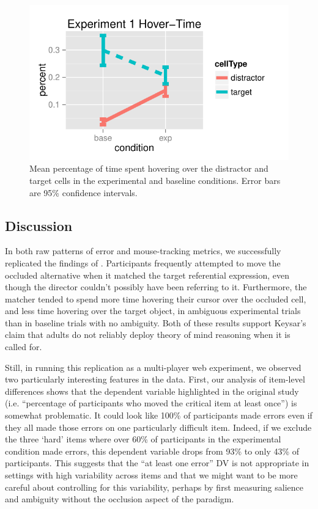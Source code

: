\documentclass[10pt,letterpaper]{article}
\begin{document}
\begin{figure}[b!]
\begin{center}
\includegraphics[scale=.8]{images/exp1MouseTracking.pdf}
\caption{Mean percentage of time spent hovering over the distractor and target cells in the experimental and baseline conditions. Error bars are 95\% confidence intervals.}
\label{fig:exp1hover}
\end{center}
\end{figure}

\subsection{Discussion}

In both raw patterns of error and mouse-tracking metrics, we successfully replicated the findings of . Participants frequently attempted to move the occluded alternative when it matched the target referential expression, even though the director couldn't possibly have been referring to it. Furthermore, the matcher tended to spend more time hovering their cursor over the occluded cell, and less time hovering over the target object, in ambiguous experimental trials than in baseline trials with no ambiguity. Both of these results support Keysar's claim that adults do not reliably deploy theory of mind reasoning when it is called for.

Still, in running this replication as a multi-player web experiment, we observed two particularly interesting features in the data. First, our analysis of item-level differences shows that the dependent variable highlighted in the original study (i.e. ``percentage of participants who moved the critical item at least once'') is somewhat problematic. It could look like 100\% of participants made errors even if they all made those errors on one particularly difficult item. Indeed, if we exclude the three `hard' items where over 60\% of participants in the experimental condition made errors, this dependent variable drops from 93\% to only 43\% of participants. This suggests that the ``at least one error'' DV is not appropriate in settings with high variability across items and that we might want to be more careful about controlling for this variability, perhaps by first measuring salience and ambiguity without the occlusion aspect of the paradigm.
\end{document}
